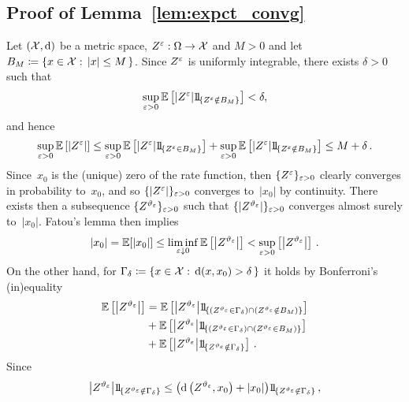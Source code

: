 \subsection{Proof of Lemma~\ref{lem:expct_convg}}\label{sec:lem:expct_convg_Proof}
Let $(\mathcal{X}, \mathrm{d})$ be a metric space, $Z^\varepsilon:\Omega\rightarrow \mathcal{X}$ and $M>0$ and let ${B_M \coloneqq \left \{ x\in\mathcal{X}: \, |x| \leq M \, \right \}}$. 
Since $Z^\varepsilon$ is uniformly integrable, there exists $\delta>0$ such that
\[
\sup_{\eps>0}\EE\left[ \left\vert Z^\eps \right\vert \ind_{\left\{ Z^\eps \notin B_M \right\}} \right] < \delta,
\]
and hence 
$$
\sup_{\eps>0}\EE\left[ \left\vert Z^\eps \right\vert \right] \leq \sup_{\eps>0}\EE\left[ \left\vert Z^\eps \right\vert \ind_{\left\{ Z^\eps \in B_M \right\}} \right] + \sup_{\eps>0}\EE\left[ \left\vert Z^\eps \right\vert \ind_{\left\{ Z^\eps \notin B_M \right\}} \right]
\leq M + \delta\,.
$$
Since~$x_0$ is the (unique) zero of the rate function, then $\{Z^{\varepsilon}\}_{\varepsilon>0}$ clearly converges in probability to~$x_0$,
and so $\{|Z^{\varepsilon}|\}_{\varepsilon>0}$ converges to~$|x_0|$ by continuity. There exists then a subsequence $\{Z^{\vartheta_{\varepsilon}}\}_{\varepsilon>0}$ such that $\{|Z^{\vartheta_{\varepsilon}}|\}_{\varepsilon>0}$
converges almost surely to~$|x_0|$.
Fatou's lemma then implies
$$
|x_0| = \mathbb{E}[|x_0|] \leq \liminf_{\varepsilon\downarrow 0} \mathbb{E}\left[ \left\vert Z^{\vartheta_{\varepsilon}} \right\vert \right] < \sup_{\varepsilon>0} \left[ \left\vert Z^{\vartheta_{\varepsilon}} \right\vert \right]\,.
$$
On the other hand, for ${\Gamma_{\delta} \coloneqq \{x \in \mathcal{X}: \, \mathrm{d}(x,x_0)>\delta \, \}}$ it holds by Bonferroni's (in)equality
\begin{align*}
\EE\left[ \left\vert Z^{\vartheta_{\eps}} \right\vert \right] 
&= \EE\left[ \left\vert Z^{\vartheta_{\eps}} \right\vert \ind_{\left \{ (Z^{\vartheta_{\eps}} \in \Gamma_\delta) \cap (Z^{\vartheta_{\eps}} \notin B_M) \right \}} \right] \\
&+ \EE\left[ \left\vert Z^{\vartheta_{\eps}} \right\vert \ind_{\left \{ (Z^{\vartheta_{\eps}} \in \Gamma_\delta) \cap (Z^{\vartheta_{\eps}} \in B_M) \right \}} \right] \\
&+ \EE\left[ \left\vert Z^{\vartheta_{\eps}} \right\vert \ind_{\left \{ Z^{\vartheta_{\eps}} \notin \Gamma_\delta \right \}} \right]\,.
\end{align*}
Since 
\[\left\vert Z^{\vartheta_{\eps}} \right\vert \ind_{\left \{ Z^{\vartheta_{\eps}} \notin \Gamma_\delta \right \}}\leq \left ( \D\left(Z^{\vartheta_{\eps}}, x_0\right) + |x_0| \right ) \ind_{\left \{ Z^{\vartheta_{\eps}} \notin \Gamma_\delta \right \}}\,,
\]
